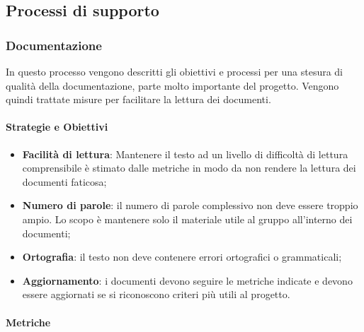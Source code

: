         
        
        \subsection{Processi di supporto}
            \subsubsection{Documentazione}
            In questo processo vengono descritti gli obiettivi e processi per una stesura di qualità della documentazione, parte molto importante del progetto. Vengono quindi trattate misure per facilitare la lettura dei documenti.
            
            \paragraph{Strategie e Obiettivi}
            \begin{itemize}
                \item \textbf{Facilità di lettura}: Mantenere il testo ad un livello di difficoltà di lettura comprensibile è stimato dalle metriche in modo da non rendere la lettura dei documenti faticosa;
                \item \textbf{Numero di parole}: il numero di parole complessivo non deve essere troppio ampio. Lo scopo è mantenere solo il materiale utile al gruppo all'interno dei documenti;
                \item \textbf{Ortografia}: il testo non deve contenere errori ortografici o grammaticali;
                \item \textbf{Aggiornamento}: i documenti devono seguire le metriche indicate e devono essere aggiornati se si riconoscono criteri più utili al progetto.
            \end{itemize}
    \newpage
            \paragraph{Metriche}
            
            \hphantom{}
         \def\productquality{
                           {   Gulpease index,
                                $89 + (300*Frasi - 10*\frac{Lettere}{Parole}$, 
                                $40 < IG \leq 100$,
                                $80 < IG \leq 100$
                            },
                            {   Correttezza ortografica,
                                numero totale di errori, 
                                0,
                                0
                            },
                        }
                    
                    
